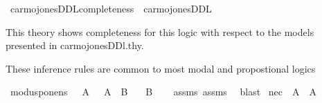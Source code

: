 %
\begin{isabellebody}%
%
%
\isadelimtheory
%
\endisadelimtheory
%
\isatagtheory
{}\isamarkupfalse%
\ carmojones{\isacharunderscore}DDL{\isacharunderscore}completeness\ \ carmojones{\isacharunderscore}DDL\isanewline
\isanewline
{}%
\endisatagtheory
{\isafoldtheory}%
%
\isadelimtheory
%
\endisadelimtheory
%
\begin{isamarkuptext}%
This theory shows completeness for this logic with respect to the models presented in carmojonesDDl.thy.%
\end{isamarkuptext}\isamarkuptrue%
%
\isadelimdocument
%
\endisadelimdocument
%
\isatagdocument
%
\isamarkuptrue%
%
\isamarkuptrue%
%
\endisatagdocument
{\isafolddocument}%
%
\isadelimdocument
%
\endisadelimdocument
%
\begin{isamarkuptext}%
These inference rules are common to most modal and propostional logics%
\end{isamarkuptext}\isamarkuptrue%
\isamarkupfalse%
\ modus{\isacharunderscore}ponens{\isacharcolon}\ \ {\isachardoublequoteopen}{\isasymTurnstile}\ A{\isachardoublequoteclose}\ \ {\isachardoublequoteopen}{\isasymTurnstile}\ {\isacharparenleft}A\ \isactrlbold {\isasymrightarrow}\ B{\isacharparenright}{\isachardoublequoteclose}\isanewline
\ \ \ {\isachardoublequoteopen}{\isasymTurnstile}B{\isachardoublequoteclose}\isanewline
%
\isadelimproof
\ \ %
\endisadelimproof
%
\isatagproof
{}\isamarkupfalse%
\ assms{\isacharparenleft}{}{\isacharparenright}\ assms{\isacharparenleft}{}{\isacharparenright}\ \isamarkupfalse%
\ blast\isanewline
%
\isanewline
%
%
\endisatagproof
{\isafoldproof}%
%
\isadelimproof
\isanewline
%
\endisadelimproof
\isanewline
{}\isamarkupfalse%
\ nec{\isacharcolon}\ \ {\isachardoublequoteopen}{\isasymTurnstile}A{\isachardoublequoteclose}\ \ {\isachardoublequoteopen}{\isasymTurnstile}{\isacharparenleft}{\isasymbox}A{\isacharparenright}{\isachardoublequoteclose}\isanewline
%
\isadelimproof
\ \ %
\endisadelimproof

\end{isabellebody}
